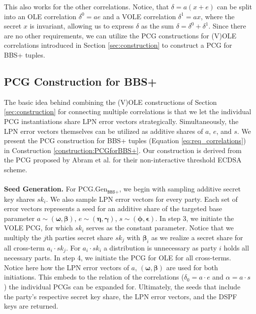 This also works for the other correlations. Notice, that $\delta = a(x+e)$ can be split into an OLE correlation $\delta^0 = ae$ and a VOLE correlation $\delta^1 = ax$, where the secret $x$ is invariant, allowing us to express $\delta$ as the sum $\delta = \delta^0 + \delta^1$. Since there are no other requirements, we can utilize the PCG constructions for (V)OLE correlations introduced in Section \ref{sec:construction} to construct a PCG for BBS+ tuples.

\subsection{PCG Construction for BBS+}
The basic idea behind combining the (V)OLE constructions of Section \ref{sec:construction} for connecting multiple correlations is that we let the individual PCG instantiations share LPN error vectors strategically. Simultaneously, the LPN error vectors themselves can be utilized as additive shares of $a$, $e$, and $s$. We present the PCG construction for BBS+ tuples (Equation \ref{eq:req_correlations}) in Construction \ref{construction:PCGforBBS+}. Our construction is derived from the PCG proposed by Abram et al. \cite{abram2022low} for their non-interactive threshold ECDSA scheme.
\\\\
\textbf{Seed Generation.} For PCG.Gen$_{\texttt{BBS+}}$, we begin with sampling additive secret key shares $sk_i$. We also sample LPN error vectors for every party. Each set of error vectors represents a seed for an additive share of the targeted base parameter $a \sim (\boldsymbol{\omega}, \boldsymbol{\beta})$, $e \sim (\boldsymbol{\eta}, \boldsymbol{\gamma})$, $s \sim (\boldsymbol{\phi}, \boldsymbol{\epsilon})$. In step 3, we initiate the VOLE PCG, for which $sk_i$ serves as the constant parameter. Notice that we multiply the $j$th parties secret share $sk_j$ with $\boldsymbol{\beta}_i$ as we realize a secret share for all cross-term $a_i\cdot sk_j$. For $a_i\cdot sk_i$ a distribution is unnecessary as party $i$ holds all necessary parts. In step 4, we initiate the PCG for OLE for all cross-terms. Notice here how the LPN error vectors of $a$, $(\boldsymbol{\omega}, \boldsymbol{\beta})$ are used for both initiations. This embeds to the relation of the correlations ($\delta_0 = a\cdot e$ and $\alpha = a\cdot s$) the individual PCGs can be expanded for. Ultimately, the seeds that include the party's respective secret key share, the LPN error vectors, and the DSPF keys are returned.
\\\\
